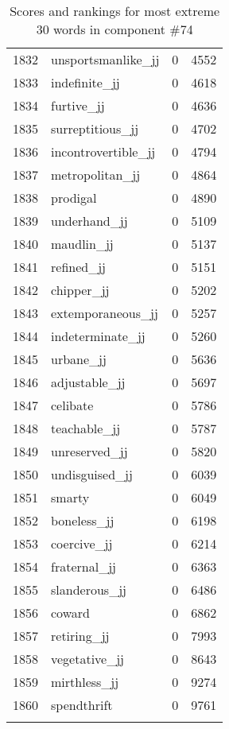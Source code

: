 \begin{longtable}[!htbp]{| rlr@{.}l |}
    1832 & unsportsmanlike\_jj & 0 & 4552 \\
    1833 & indefinite\_jj & 0 & 4618 \\
    1834 & furtive\_jj & 0 & 4636 \\
    1835 & surreptitious\_jj & 0 & 4702 \\
    1836 & incontrovertible\_jj & 0 & 4794 \\
    1837 & metropolitan\_jj & 0 & 4864 \\
    1838 & prodigal & 0 & 4890 \\
    1839 & underhand\_jj & 0 & 5109 \\
    1840 & maudlin\_jj & 0 & 5137 \\
    1841 & refined\_jj & 0 & 5151 \\
    1842 & chipper\_jj & 0 & 5202 \\
    1843 & extemporaneous\_jj & 0 & 5257 \\
    1844 & indeterminate\_jj & 0 & 5260 \\
    1845 & urbane\_jj & 0 & 5636 \\
    1846 & adjustable\_jj & 0 & 5697 \\
    1847 & celibate & 0 & 5786 \\
    1848 & teachable\_jj & 0 & 5787 \\
    1849 & unreserved\_jj & 0 & 5820 \\
    1850 & undisguised\_jj & 0 & 6039 \\
    1851 & smarty & 0 & 6049 \\
    1852 & boneless\_jj & 0 & 6198 \\
    1853 & coercive\_jj & 0 & 6214 \\
    1854 & fraternal\_jj & 0 & 6363 \\
    1855 & slanderous\_jj & 0 & 6486 \\
    1856 & coward & 0 & 6862 \\
    1857 & retiring\_jj & 0 & 7993 \\
    1858 & vegetative\_jj & 0 & 8643 \\
    1859 & mirthless\_jj & 0 & 9274 \\
    1860 & spendthrift & 0 & 9761 \\
    \hline
    \caption{Scores and rankings for most extreme 30 words in component \#74} \\
\end{longtable}
